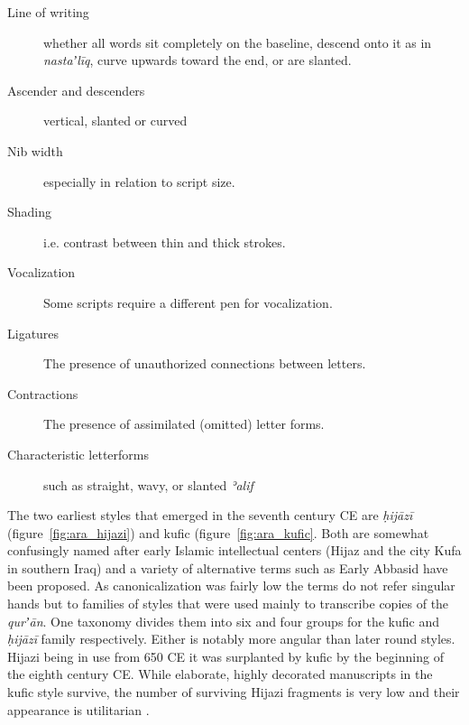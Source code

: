 \begin{description}
	\item[Line of writing] whether all words sit completely on the
			       baseline, descend onto it as in
			       \emph{nastaʼlīq}, curve upwards toward the end,
			       or are slanted.
	\item[Ascender and descenders] vertical, slanted or curved
	\item[Nib width] especially in relation to script size.
	\item[Shading] i.e. contrast between thin and thick strokes.
	\item[Vocalization] Some scripts require a different pen for vocalization.
	\item[Ligatures] The presence of unauthorized connections between letters.
	\item[Contractions] The presence of assimilated (omitted) letter forms.
	\item[Characteristic letterforms] such as straight, wavy, or slanted \emph{ʾalif}
\end{description}

The two earliest styles that emerged in the seventh century CE are
\emph{ḥijāzī} (figure~\ref{fig:ara_hijazi}) and kufic
(figure~\ref{fig:ara_kufic}. Both are somewhat confusingly named after early
Islamic intellectual centers (Hijaz and the city Kufa in southern Iraq) and a
variety of alternative terms such as Early Abbasid have been proposed. As
canonicalization was fairly low the terms do not refer singular hands but to
families of styles that were used mainly to transcribe copies of the
\emph{qurʼān}. One taxonomy divides them into six and four groups for the kufic
and \emph{ḥijāzī} family respectively. Either is notably more angular than
later round styles.  Hijazi being in use from 650 CE it was surplanted by kufic
by the beginning of the eighth century CE. While elaborate, highly decorated
manuscripts in the kufic style survive, the number of surviving Hijazi
fragments is very low and their appearance is utilitarian \cite[pg. 98,
124]{gacek2009arabic}.

